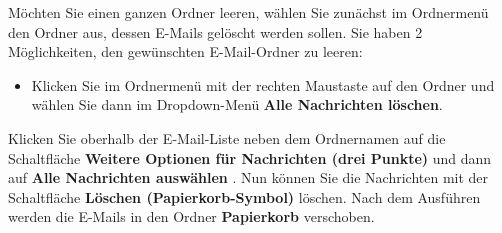 \documentclass[
  letterpaper,
  DIV=11,
  numbers=noendperiod]{scrreprt}
\providecommand{\tightlist}{%
  \setlength{\itemsep}{0pt}\setlength{\parskip}{0pt}}\usepackage{longtable,booktabs,array}
\begin{document}
Möchten Sie einen ganzen Ordner leeren, wählen Sie zunächst im
Ordnermenü den Ordner aus, dessen E-Mails gelöscht werden sollen. Sie
haben 2 Möglichkeiten, den gewünschten E-Mail-Ordner zu leeren:

\begin{itemize}
\tightlist
\item
  Klicken Sie im Ordnermenü mit der rechten Maustaste auf den Ordner und
  wählen Sie dann im Dropdown-Menü \textbf{Alle Nachrichten löschen}.
\end{itemize}

Klicken Sie oberhalb der E-Mail-Liste neben dem Ordnernamen auf die
Schaltfläche \textbf{Weitere Optionen für Nachrichten (drei Punkte)} und
dann auf \textbf{Alle Nachrichten auswählen} . Nun können Sie die
Nachrichten mit der Schaltfläche \textbf{Löschen (Papierkorb-Symbol)}
löschen. Nach dem Ausführen werden die E-Mails in den Ordner
\textbf{Papierkorb} verschoben.
\end{document}
